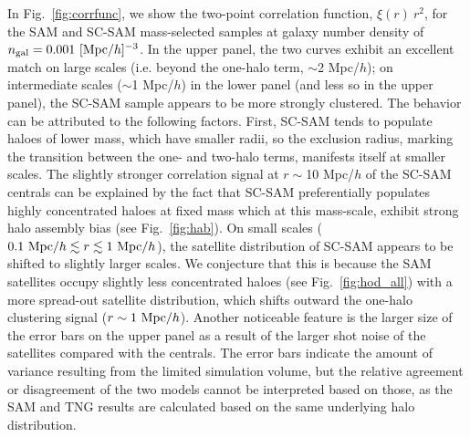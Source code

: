 \documentclass[fleqn,usenatbib]{mnras}
\newcommand{\rss}[1]{\textcolor{purple}{(rss: #1)}}
\begin{document}
In Fig.~\ref{fig:corrfunc}, we show the two-point correlation function, $\xi(r) \ r^2$, for the SAM and SC-SAM mass-selected samples at galaxy number density of $n_{\rm gal} = 0.001 \ [{\rm Mpc}/h]^{-3}$. In the upper panel, the two curves exhibit an excellent match on large scales (i.e. beyond the one-halo term, $\sim$2 Mpc/$h$); on intermediate scales ($\sim$1 Mpc/$h$) in the lower panel (and less so in the upper panel), the SC-SAM sample appears to be more strongly clustered. The behavior can be attributed to the following factors. First, SC-SAM tends to populate haloes of lower mass, which have smaller radii, so the exclusion radius, marking the transition between the one- and two-halo terms, manifests itself at smaller scales. The slightly stronger correlation signal at $r \sim$10 Mpc/$h$ of the SC-SAM centrals can be explained by the fact that SC-SAM preferentially populates highly concentrated haloes at fixed mass which at this mass-scale, exhibit strong halo assembly bias (see Fig.~\ref{fig:hab}). On small scales ($0.1 \ {\rm Mpc}/h \lesssim r \lesssim 1 \ {\rm Mpc}/h$), the satellite distribution of SC-SAM appears to be shifted to slightly larger scales. We conjecture that this is because the SAM satellites occupy slightly less concentrated haloes (see Fig.~\ref{fig:hod_all}) with a more spread-out satellite distribution, which shifts outward the one-halo clustering signal ($r \sim 1 \ {\rm Mpc}/h$). Another noticeable feature is the larger size of the error bars on the upper panel as a result of the larger shot noise of the satellites compared with the centrals. The error bars indicate the amount of variance resulting from the limited simulation volume, but the relative agreement or disagreement of the two models cannot be interpreted based on those, as the SAM and TNG results are calculated based on the same underlying halo distribution.
\end{document}
